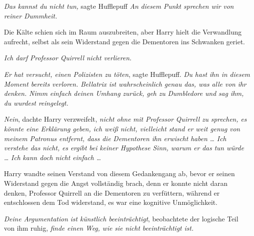 \emph{Das kannst du nicht tun,} sagte Hufflepuff \emph{An diesem Punkt sprechen wir von reiner Dummheit.}

Die Kälte schien sich im Raum auszubreiten, aber Harry hielt die Verwandlung aufrecht, selbst als sein Widerstand gegen die Dementoren ins Schwanken geriet.

\emph{Ich darf Professor Quirrell nicht verlieren.}

\emph{Er hat versucht, einen Polizisten zu töten}, sagte Hufflepuff. \emph{Du hast ihn in diesem Moment bereits verloren. Bellatrix ist wahrscheinlich genau das, was alle von ihr denken. Nimm einfach deinen Umhang zurück, geh zu Dumbledore und sag ihm, du wurdest reingelegt.}

\emph{Nein}, dachte Harry verzweifelt, \emph{nicht ohne mit Professor Quirrell zu sprechen, es könnte eine Erklärung geben, ich weiß nicht, vielleicht stand er weit genug von meinem Patronus entfernt, dass die Dementoren ihn erwischt haben … Ich verstehe das nicht, es ergibt bei keiner Hypothese Sinn, warum er das tun würde … Ich kann doch nicht einfach …}

Harry wandte seinen Verstand von diesem Gedankengang ab, bevor er seinen Widerstand gegen die Angst vollständig brach, denn er konnte nicht daran denken, Professor Quirrell an die Dementoren zu verfüttern, während er entschlossen dem Tod widerstand, es war eine kognitive Unmöglichkeit.

\emph{Deine Argumentation ist künstlich beeinträchtigt}, beobachtete der logische Teil von ihm ruhig, \emph{finde einen Weg, wie sie nicht beeinträchtigt ist.}

